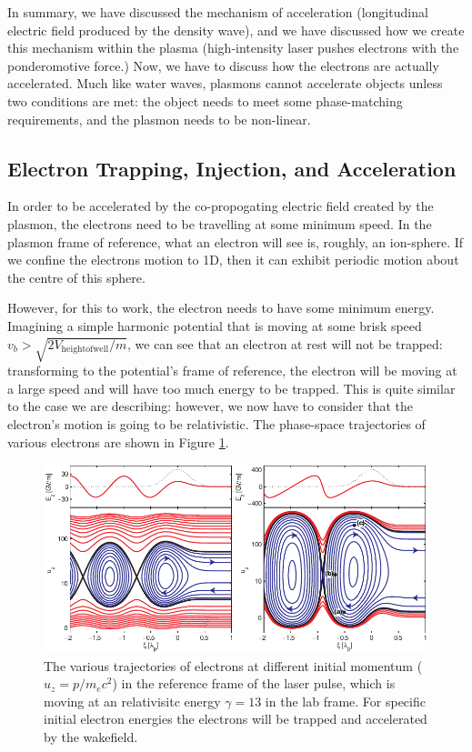 \documentclass[12pt,letter]{article}
\begin{document}
\pagebreak

   In summary, we have discussed the mechanism of acceleration (longitudinal
   electric field produced by the density wave), and we have discussed how we
   create this mechanism within the plasma (high-intensity laser pushes
   electrons with the ponderomotive force.) Now, we have to discuss how the
   electrons are actually accelerated. Much like water waves, plasmons cannot
   accelerate objects unless two conditions are met\cite{PhysRevLett.113.085001}: the object needs to meet
   some phase-matching requirements, and the plasmon needs to be non-linear. 


   \subsection{Electron Trapping, Injection, and Acceleration}

    In order to be accelerated by the co-propogating electric field created by the
    plasmon, the electrons need to be travelling at some minimum speed. In the
    plasmon frame of reference, what an electron will see is, roughly, an
    ion-sphere. If we confine the electrons motion to 1D, then it can exhibit
    periodic motion about the centre of this sphere. 

    However, for this to work, the electron needs to have some minimum energy.
    Imagining a simple harmonic potential that is moving at some brisk speed $v_b >
    \sqrt{2 V_\mathrm{height of well}/m} $, we can see that an electron at rest will
    not be trapped: transforming to the potential's frame of reference, the
    electron will be moving at a large speed and will have too much energy to be trapped.
    This is quite similar to the case we are describing: however, we now have to
    consider that the electron's motion is going to be relativistic. The
    phase-space trajectories of various electrons are shown in Figure
    \ref{fig:trapping}.
\begin{figure}[h]%
	\includegraphics[width=\textwidth]{../figures/trapping.pdf}
    \caption{\label{fig:trapping} The various trajectories of electrons at
    different initial momentum ($u_z= p/m_e c^2$) in the reference frame of the laser
pulse, which is moving at an relativisitc energy $\gamma = 13$ in the lab frame.
For specific initial electron energies the electrons will be trapped and
accelerated by the wakefield. }
\end{figure}
\end{document}

